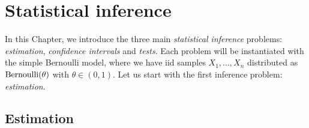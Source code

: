 



\setchapterpreamble[u]{\margintoc}
\chapter{Statistical inference}
\label{chap:statistical_inference}

In this Chapter, we introduce the three main \emph{statistical inference} problems: \emph{estimation}, \emph{confidence intervals} and \emph{tests}.
Each problem will be instantiated with the simple Bernoulli model, where we have iid samples $X_1, \ldots, X_n$ distributed as $\operatorname{Bernoulli}(\theta)$ with $\theta \in (0, 1)$.
Let us start with the first inference problem: \emph{estimation}.

\section{Estimation} %
\label{sec:estimation}

